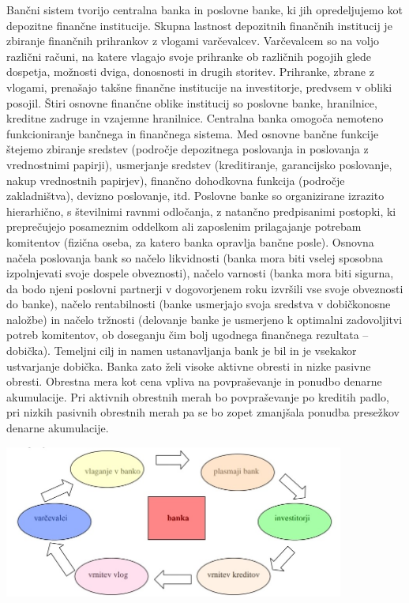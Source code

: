 \documentclass[letterpaper, titlepage, freqn]{article}
\begin{document}
Bančni sistem tvorijo centralna banka in poslovne banke, ki jih opredeljujemo kot depozitne finančne institucije. Skupna lastnost depozitnih finančnih institucij je zbiranje finančnih prihrankov z vlogami varčevalcev. Varčevalcem so na voljo različni računi, na katere vlagajo svoje prihranke ob različnih pogojih glede dospetja, možnosti dviga, donosnosti in drugih storitev. Prihranke, zbrane z vlogami, prenašajo takšne finančne institucije na investitorje, predvsem v obliki posojil. Štiri osnovne finančne oblike institucij so poslovne banke, hranilnice, kreditne zadruge in vzajemne hranilnice.
Centralna banka omogoča nemoteno funkcioniranje bančnega in finančnega sistema.
Med osnovne bančne funkcije štejemo zbiranje sredstev (področje depozitnega poslovanja in poslovanja z vrednostnimi papirji), usmerjanje sredstev (kreditiranje, garancijsko poslovanje, nakup vrednostnih papirjev), finančno dohodkovna funkcija (področje zakladništva), devizno poslovanje, itd.
Poslovne banke so organizirane izrazito hierarhično, s številnimi ravnmi odločanja, z natančno predpisanimi postopki, ki preprečujejo posameznim oddelkom ali zaposlenim prilagajanje potrebam komitentov (fizična oseba, za katero banka opravlja bančne posle).
Osnovna načela poslovanja bank so načelo likvidnosti (banka mora biti vselej sposobna izpolnjevati svoje dospele obveznosti), načelo varnosti (banka mora biti sigurna, da bodo njeni poslovni partnerji v dogovorjenem roku izvršili vse svoje obveznosti do banke), načelo rentabilnosti (banke usmerjajo svoja sredstva v dobičkonosne naložbe) in načelo tržnosti (delovanje banke je usmerjeno k optimalni zadovoljitvi potreb komitentov, ob doseganju čim bolj ugodnega finančnega rezultata – dobička).
Temeljni cilj in namen ustanavljanja bank je bil in je vsekakor ustvarjanje dobička. Banka zato želi visoke aktivne obresti in nizke pasivne obresti. Obrestna mera kot cena vpliva na povpraševanje in ponudbo denarne akumulacije. Pri aktivnih obrestnih merah bo povpraševanje po kreditih padlo, pri nizkih pasivnih obrestnih merah pa se bo zopet zmanjšala ponudba presežkov denarne akumulacije.\\

\begin{center}
\includegraphics[height=5cm]{tokokrog_sredstev}
\end{center}
\end{document}
